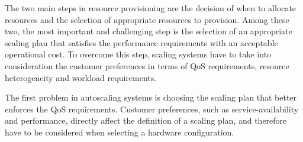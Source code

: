 

The two main steps in resource provisioning are the decision of when to allocate resources and the selection of appropriate resources to provision.
Among these two, the most important and challenging step is the selection of an appropriate scaling plan that satisfies the performance requirements with an acceptable operational cost. 
To overcome this step, scaling systems have to take into consideration the customer preferences in terms of QoS requirements, resource heterogeneity and workload requirements.

The first problem in autoscaling systems is choosing the scaling plan that better enforces the QoS requirements. Customer preferences, such as service-availability and performance, directly affect the definition of a scaling plan, and therefore have to be considered when selecting a hardware configuration.




